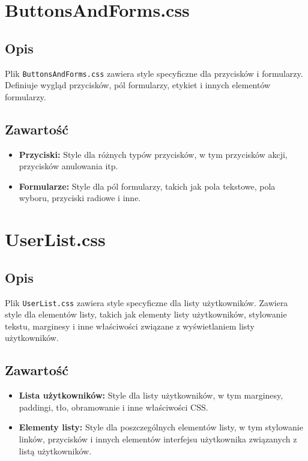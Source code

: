 \documentclass[12pt,a4paper]{report}
\begin{document}
\section{ButtonsAndForms.css}

\subsection{Opis}
Plik \texttt{ButtonsAndForms.css} zawiera style specyficzne dla przycisków i formularzy. Definiuje wygląd przycisków, pól formularzy, etykiet i innych elementów formularzy.

\subsection{Zawartość}
\begin{itemize}
    \item \textbf{Przyciski:} Style dla różnych typów przycisków, w tym przycisków akcji, przycisków anulowania itp.
    \item \textbf{Formularze:} Style dla pól formularzy, takich jak pola tekstowe, pola wyboru, przyciski radiowe i inne.
\end{itemize}

\section{UserList.css}

\subsection{Opis}
Plik \texttt{UserList.css} zawiera style specyficzne dla listy użytkowników. Zawiera style dla elementów listy, takich jak elementy listy użytkowników, stylowanie tekstu, marginesy i inne właściwości związane z wyświetlaniem listy użytkowników.

\subsection{Zawartość}
\begin{itemize}
    \item \textbf{Lista użytkowników:} Style dla listy użytkowników, w tym marginesy, paddingi, tło, obramowanie i inne właściwości CSS.
    \item \textbf{Elementy listy:} Style dla poszczególnych elementów listy, w tym stylowanie linków, przycisków i innych elementów interfejsu użytkownika związanych z listą użytkowników.
\end{itemize}
\end{document}
